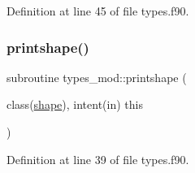 Definition at line 45 of file types.\+f90.

\mbox{\label{namespacetypes__mod_ab09448209b0b127b46bc8fa8bf29b739}} 
\subsubsection{\texorpdfstring{printshape()}{printshape()}}
{\footnotesize\ttfamily subroutine types\+\_\+mod\+::printshape (\begin{DoxyParamCaption}\item[{class(\hyperlink{structtypes__mod_1_1shape}{shape}), intent(in)}]{this }\end{DoxyParamCaption})\hspace{0.3cm}{\ttfamily [private]}}



Definition at line 39 of file types.\+f90.

